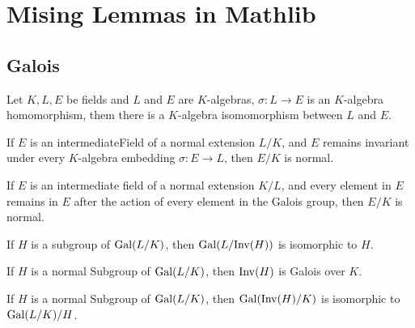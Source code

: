 \chapter{Mising Lemmas in Mathlib}

\section{Galois}

\begin{lemma}
	\leanok
	Let $ K, L, E $ be fields and $ L $ and $ E $ are $ K $-algebras, $\sigma : L \to E $ is an $ K $-algebra homomorphism, them there is a $ K $-algebra isomomorphism between $ L $ and $ E $.
\end{lemma}

\begin{lemma}
	\leanok
	If $E$ is an intermediateField of a normal extension $L / K$, and $E$ remains invariant under every $K$-algebra embedding $\sigma : E \to L$, then $E / K$ is normal.
\end{lemma}

\begin{theorem}
	\leanok
	If $E$ is an intermediate field of a normal extension $K / L$, and every element in $E$ remains in $E$ after the action of every element in the Galois group, then $E / K$ is normal.
\end{theorem}

\begin{theorem}
	\leanok
	If $H$ is a subgroup of $\mathrm{Gal}(L/K)$, then $\mathrm{Gal}(L / \mathrm{Inv} (H))$ is isomorphic to $H$.
\end{theorem}

\begin{theorem}
	\leanok
	If $H$ is a normal Subgroup of $\mathrm{Gal}(L/K)$, then $\mathrm{Inv} (H)$ is Galois over $K$.
\end{theorem}

\begin{theorem}
	\leanok
	If $H$ is a normal Subgroup of $\mathrm{Gal}(L / K)$, then $\mathrm{Gal}(\mathrm{Inv}(H) / K)$ is isomorphic to $\mathrm{Gal}(L / K) / H$.
\end{theorem}

